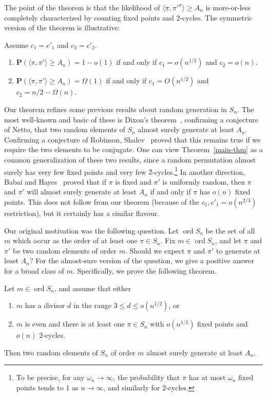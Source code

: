 \documentclass[ALCO,ThmDefs,Unicode,epreuves]{cedram}
\DeclareMathOperator{\ord}{ord}
\newcommand\ordn{\ord S_n}
\renewcommand\P{\mathbf{P}}
\begin{document}
The point of the theorem is that the likelihood of $\langle \pi, {\pi'}^\sigma\rangle \geq A_n$ is more-or-less completely characterized by counting fixed points and $2$-cycles. The symmetric version of the theorem is illustrative:

\begin{coro} \label{cor:symmetric-case}
Assume $c_1 = c'_1$ and $c_2 = c'_2$.
\begin{enumerate}
 \item\label{coro1.2_1} $\P(\langle \pi, \pi' \rangle \geq A_n) = 1-o(1)$ if and only if $c_1 = o(n^{1/2})$ and $c_2 = o(n)$.
 \item\label{coro1.2_2} $\P(\langle \pi, \pi' \rangle \geq A_n) = \Omega(1)$ if and only if $c_1 = O(n^{1/2})$ and $c_2 = n/2 - \Omega(n)$.
\end{enumerate}
\end{coro}

Our theorem refines some previous results about random generation in $S_n$. The most well-known and basic of these is Dixon's theorem~\cite{dixon}, confirming a conjecture of Netto, that two random elements of $S_n$ almost surely generate at least $A_n$. Confirming a conjecture of Robinson, Shalev~\cite{shalev} proved that this remains true if we require the two elements to be conjugate. One can view Theorem~\ref{main-thm} as a common generalization of these two results, since a random permutation almost surely has very few fixed points and very few $2$-cycles.\footnote{To be precise, for any $\omega_n \to \infty$, the probability that $\pi$ has at most $\omega_n$ fixed points tends to $1$ as $n\to\infty$, and similarly for $2$-cycles.} In another direction, Babai and Hayes~\cite{babai_hayes} proved that if $\pi$ is fixed and $\pi'$ is uniformly random, then $\pi$ and $\pi'$ will almost surely generate at least $A_n$ if and only if $\pi$ has $o(n)$ fixed points. This does not follow from our theorem (because of the $c_1, c'_1 = o(n^{2/3})$ restriction), but it certainly has a similar flavour.

Our original motivation was the following question. Let $\ordn$ be the set of all $m$ which occur as the order of at least one $\pi \in S_n$. Fix $m \in \ord S_n$, and let $\pi$ and $\pi'$ be two random elements of order $m$. Should we expect $\pi$ and $\pi'$ to generate at least $A_n$? For the almost-sure version of the question, we give a positive answer for a broad class of $m$. Specifically, we prove the following theorem.

\begin{theorem} \label{thm:fixed-order-almost-sure}
Let $m \in \ord S_n$, and assume that either
\begin{enumerate}
 \item\label{theo1.3_1} $m$ has a divisor $d$ in the range $3 \leq d \leq o(n^{1/2})$, or
 \item\label{theo1.3_2} $m$ is even and there is at least one $\pi \in S_n$ with $o(n^{1/2})$ fixed points and $o(n)$ $2$-cycles.
\end{enumerate}
Then two random elements of $S_n$ of order $m$ almost surely generate at least $A_n$.
\end{theorem}
\end{document}
